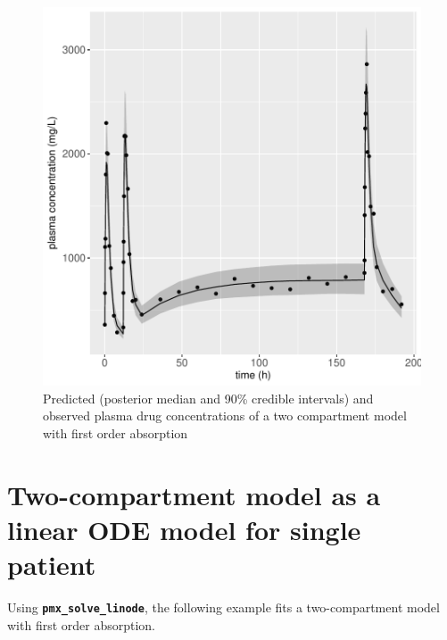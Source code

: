 \documentclass[10pt, reqno, oneside]{amsbook}
\numberwithin{equation}{chapter}
\numberwithin{figure}{chapter}
\numberwithin{table}{chapter}
\theoremstyle{remark}
\begin{document}
\begin{figure}[htbp]
\centering
\includegraphics[width=0.5\linewidth]{../example-models/R/deliv/figure/TwoCptModel/TwoCptModelPlots006.pdf}
\caption{\label{twocpt_mcmc_predict}
Predicted (posterior median and 90\% credible intervals) and observed plasma drug concentrations of a two compartment model with first order absorption}
\end{figure}

\section{Two-compartment model as a linear ODE model for single patient}
\label{sec:org8ae67a4}
Using {\small \color{MRGGreen} \texttt{\textbf{pmx\_solve\_linode}}}, the following example fits a two-compartment model
with first order absorption.
\end{document}
